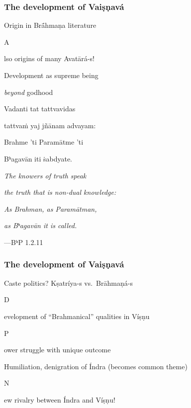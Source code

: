 \documentclass[pdf]{beamer}
\newcommand{\Subitem}[1]{{\setlength\itemindent{12pt} \item[-] #1}}
\begin{document}
\begin{frame} \frametitle{The development of Vaiṣṇavá}
\begin{itemize}
	\item Origin in Brā́hmaṇa literature
	\Subitem Also origins of many Avatārá-s!
	\item Development as supreme being
	\Subitem {\emph{beyond} godhood}
\end{itemize}

\begin{center}
	Vadanti tat tattvavidas

	tattvaṁ yaj jñānam advayam:

	Brahme 'ti Paramātme 'ti

	Bʰagavān iti ṡabdyate.

	\vspace{\baselineskip}

	\textit{The knowers of truth speak}

	\textit{the truth that is non-dual knowledge:}

	\textit{As Brahman, as Paramātman,}

	\textit{as Bʰagavān it is called.}

	\vspace{\baselineskip}

	---BʰP 1.2.11
\end{center}
\end{frame}

\begin{frame} \frametitle{The development of Vaiṣṇavá}
\begin{itemize}
	\item Caste politics? Kṣatríya-s vs.~Brāhmaṇá-s
	\Subitem Development of ``Brahmanical'' qualities in Víṣṇu
	\Subitem Power struggle with unique outcome
	\item Humiliation, denigration of Índra (becomes common theme)
	\Subitem New rivalry between Índra and Víṣṇu!
\end{itemize}
\end{frame}

\end{document}
